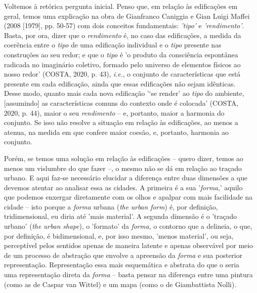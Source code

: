 \documentclass[twoside, 12pt, english,italian,latin,greek,french,spanish,brazil]{book}
\begin{document}
     Voltemos à retórica pergunta inicial. Penso que, em relação às edificações em geral, temos uma explicação na obra de Gianfranco Caniggia e Gian Luigi Maffei (2008 [1979], pp. 50-57) com dois conceitos fundamentais: \textit{'tipo'} e \textit{'rendimento'}. Basta, por ora, dizer que o \textit{rendimento} é, no caso das edificações, a medida da coerência entre o \textit{tipo} de uma edificação individual e o \textit{tipo} presente nas construções ao seu redor; e que o \textit{tipo} é 'o produto da consciência espontânea radicada no imaginário coletivo, formado pelo universo de elementos físicos ao nosso redor' (COSTA, 2020, p. 43), \textit{i.e.}, o conjunto de características que está presente em cada edificação, ainda que essas edificações não sejam idênticas. Desse modo, quanto mais cada nova edificação '‘se render’ ao \textit{tipo} do ambiente, [assumindo] as características comuns do contexto onde é colocada' (COSTA, 2020, p. 44), maior o seu \textit{rendimento} – e, portanto, maior a harmonia do conjunto. Se isso não resolve a situação em relação às edificações, ao menos a atenua, na medida em que confere maior coesão, e, portanto, harmonia ao conjunto.

     Porém, se temos uma solução em relação às edificações – quero dizer, temos ao menos um vislumbre do que fazer –, o mesmo não se dá em relação ao traçado urbano. E aqui faz-se necessário elucidar a diferença entre duas dimensões a que devemos atentar ao analisar essa as cidades. A primeira é a sua '\textit{forma},' aquilo que podemos enxergar diretamente com os olhos e apalpar com mais facilidade na cidade – isto porque a \textit{forma} urbana (\textit{the urban form}) é, por definição, tridimensional, eu diria até 'mais material'. A segunda dimensão é o 'traçado urbano' (\textit{the urban shape}), o 'formato' da \textit{forma,} o contorno que a delineia, o que, por definição, é bidimensional, e, por isso mesmo, 'menos material', ou seja, perceptível pelos sentidos apenas de maneira latente e apenas observável por meio de um processo de abstração que envolve a apreensão da \textit{forma} e sua posterior representação. Representação essa mais esquemática e abstrata do que o seria uma representação direta da \textit{forma} – basta pensar na diferença entre uma pintura (como as de Caspar van Wittel) e um mapa (como o de Giambattista Nolli). %
\end{document}
